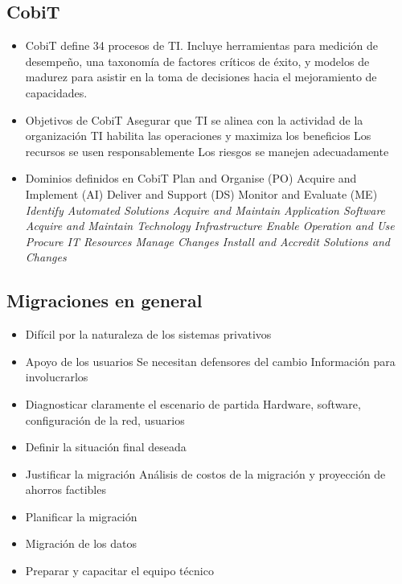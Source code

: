 \subsection {CobiT}
\begin{itemize}
	\item CobiT define 34 procesos de TI. Incluye herramientas para medición de desempeño, una taxonomía de factores críticos de éxito, y modelos de madurez para asistir en la toma de decisiones hacia el mejoramiento de capacidades. 
	\item Objetivos de CobiT
		\subitem Asegurar que 
		\subsubitem TI se alinea con la actividad de la organización
		\subsubitem TI habilita las operaciones y maximiza los beneficios
		\subsubitem Los recursos se usen responsablemente
		\subsubitem Los riesgos se manejen adecuadamente
	\item Dominios definidos en CobiT
		\subitem Plan and Organise (PO)
		\subitem Acquire and Implement (AI)
		\subitem Deliver and Support (DS)
		\subitem Monitor and Evaluate (ME)
	\emph {
		\subitem {}
		\subsubitem Identify Automated Solutions
		\subsubitem Acquire and Maintain Application Software
		\subsubitem Acquire and Maintain Technology Infrastructure
		\subsubitem Enable Operation and Use
		\subsubitem Procure IT Resources
		\subsubitem Manage Changes
		\subsubitem Install and Accredit Solutions and Changes
	}
\end{itemize}






\subsection {Migraciones en general}
\begin{itemize}
	\item Difícil por la naturaleza de los sistemas privativos
	\item Apoyo de los usuarios
	\subitem Se necesitan defensores del cambio
	\subitem Información para involucrarlos
	\item Diagnosticar claramente el escenario de partida
	\subitem Hardware, software, configuración de la red, usuarios
	\item Definir la situación final deseada
	\item Justificar la migración
	\subitem Análisis de costos de la migración y proyección de ahorros factibles
	\item Planificar la migración
	\item Migración de los datos
	\item Preparar y capacitar el equipo técnico
\end{itemize}

